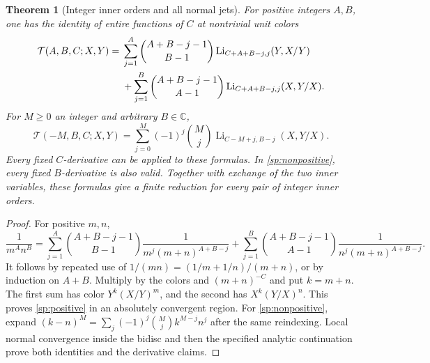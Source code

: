 \documentclass[11pt,a4paper]{article}
\newtheorem{theorem}{Theorem}[section]
\theoremstyle{definition}
\theoremstyle{remark}
\numberwithin{equation}{section}
\begin{document}
\begin{theorem}[Integer inner orders and all normal jets]
\label{sp:integer}
For positive integers $A,B$, one has the identity of entire functions
of $C$ at nontrivial unit colors
\begin{align}\label{sp:positive}
 \mathcal T(A,B,C;X,Y)
 ={}&\sum_{j=1}^{A}\binom{A+B-j-1}{B-1}
       \operatorname{Li}_{C+A+B-j,j}(Y,X/Y)\notag\\
 &+\sum_{j=1}^{B}\binom{A+B-j-1}{A-1}
       \operatorname{Li}_{C+A+B-j,j}(X,Y/X).
\end{align}
For $M\geq0$ an integer and arbitrary $B\in\mathbb C$,
\begin{equation}\label{sp:nonpositive}
 \mathcal T(-M,B,C;X,Y)
 =\sum_{j=0}^{M}(-1)^j\binom Mj
       \operatorname{Li}_{C-M+j,B-j}(X,Y/X).
\end{equation}
Every fixed $C$-derivative can be applied to these formulas.  In
\eqref{sp:nonpositive}, every fixed $B$-derivative is also valid.
Together with exchange of the two inner variables, these formulas
give a finite reduction for every pair of integer inner orders.
\end{theorem}
\begin{proof}
For positive $m,n$,
\[
 \frac1{m^A n^B}
 =\sum_{j=1}^{A}\binom{A+B-j-1}{B-1}
     \frac1{m^j(m+n)^{A+B-j}}
 +\sum_{j=1}^{B}\binom{A+B-j-1}{A-1}
     \frac1{n^j(m+n)^{A+B-j}}.
\]
It follows by repeated use of
$1/(mn)=(1/m+1/n)/(m+n)$, or by induction on $A+B$.
Multiply by the colors and $(m+n)^{-C}$ and put $k=m+n$.
The first sum has color $Y^k(X/Y)^m$, and the second has
$X^k(Y/X)^n$.  This proves \eqref{sp:positive} in an absolutely
convergent region.  For \eqref{sp:nonpositive}, expand
$(k-n)^M=\sum_j(-1)^j\binom Mj k^{M-j}n^j$ after the same reindexing.
Local normal convergence inside the bidisc and then the specified
analytic continuation prove both identities and the derivative claims.
\end{proof}
\end{document}
